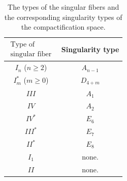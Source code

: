 \documentclass[12pt]{article}
\begin{document}
\begingroup
\renewcommand{\arraystretch}{1.1}
\begin{table}[htb]
\begin{center}
  \begin{tabular}{|c|c|} \hline
$\begin{array}{c}
\mbox{Type of} \\
\mbox{singular fiber}
\end{array}$ & Singularity type \\ \hline
$I_n$ ($n\ge 2$) & $A_{n-1}$ \\
$I^*_m$ ($m\ge 0$) & $D_{4+m}$ \\
$III$ & $A_1$ \\
$IV$ & $A_2$ \\
$IV^*$ & $E_6$ \\ 
$III^*$ & $E_7$ \\
$II^*$ & $E_8$ \\
$I_1$ & none. \\
$II$ & none. \\ \hline
\end{tabular}
\caption{The types of the singular fibers and the corresponding singularity types of the compactification space.}
\label{table:singularityand fibertype}
\end{center}
\end{table}  
\endgroup 
\end{document}
